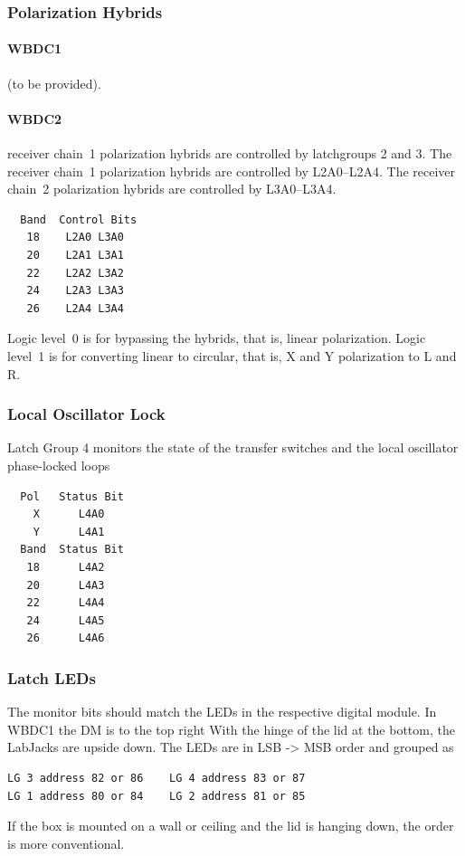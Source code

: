 \documentclass[letterpaper,11pt]{book}
\begin{document}
\subsubsection{Polarization Hybrids}

\paragraph{WBDC1} (to be provided).

\paragraph{WBDC2} receiver chain~1 polarization hybrids are controlled by
latchgroups 2 and 3. 
The receiver chain~1 polarization hybrids are controlled by L2A0--L2A4.
The receiver chain~2 polarization hybrids are controlled by L3A0--L3A4.
\begin{verbatim}
  Band  Control Bits
   18    L2A0 L3A0
   20    L2A1 L3A1
   22    L2A2 L3A2
   24    L2A3 L3A3
   26    L2A4 L3A4
 \end{verbatim}
 Logic level~0 is for bypassing the hybrids, that is, linear polarization.
Logic level~1 is for converting linear to circular, that is, X and Y
polarization to L and R.


\subsubsection{Local Oscillator Lock}

Latch Group 4 monitors the state of the transfer switches and the local 
oscillator phase-locked loops
\begin{verbatim}
  Pol   Status Bit
    X      L4A0
    Y      L4A1
  Band  Status Bit
   18      L4A2
   20      L4A3
   22      L4A4
   24      L4A5
   26      L4A6 
\end{verbatim}

\subsubsection{Latch LEDs}

The monitor bits should match the LEDs in the respective digital module.
In WBDC1 the DM is to the top right
With the hinge of the lid at the bottom, the LabJacks are upside down. 
The LEDs are in LSB -> MSB order and grouped as
\begin{verbatim}
LG 3 address 82 or 86    LG 4 address 83 or 87
LG 1 address 80 or 84    LG 2 address 81 or 85
\end{verbatim}
If the box is mounted on a wall or ceiling and the lid is hanging down,
the order is more conventional.
\end{document}
